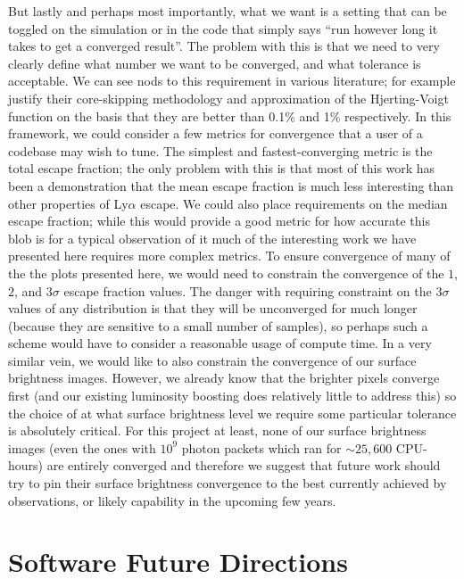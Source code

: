 But lastly and perhaps most importantly, what we want is a setting that can be toggled on the simulation or in the code that simply says ``run however long it takes to get a converged result''.
The problem with this is that we need to very clearly define what number we want to be converged, and what tolerance is acceptable.
We can see nods to this requirement in various literature; for example \citet{Smith2015} justify their core-skipping methodology and approximation of the Hjerting-Voigt function on the basis that they are better than 0.1\% and 1\% respectively.
In this framework, we could consider a few metrics for convergence that a user of a codebase may wish to tune.
The simplest and fastest-converging metric is the total escape fraction; the only problem with this is that most of this work has been a demonstration that the mean escape fraction is much less interesting than other properties of Ly$\alpha$ escape.
We could also place requirements on the median escape fraction; while this would provide a good metric for how accurate this blob is for a typical observation of it much of the interesting work we have presented here requires more complex metrics.
To ensure convergence of many of the the plots presented here, we would need to constrain the convergence of the $1$, $2$, and $3\sigma$ escape fraction values.
The danger with requiring constraint on the $3\sigma$ values of any distribution is that they will be unconverged for much longer (because they are sensitive to a small number of samples), so perhaps such a scheme would have to consider a reasonable usage of compute time.
In a very similar vein, we would like to also constrain the convergence of our surface brightness images.
However, we already know that the brighter pixels converge first (and our existing luminosity boosting does relatively little to address this) so the choice of at what surface brightness level we require some particular tolerance is absolutely critical.
For this project at least, none of our surface brightness images (even the ones with $10^{9}$ photon packets which ran for $\sim25,600$ CPU-hours) are entirely converged and therefore we suggest that future work should try to pin their surface brightness convergence to the best currently achieved by observations, or likely capability in the upcoming few years.

\section{Software Future Directions}


